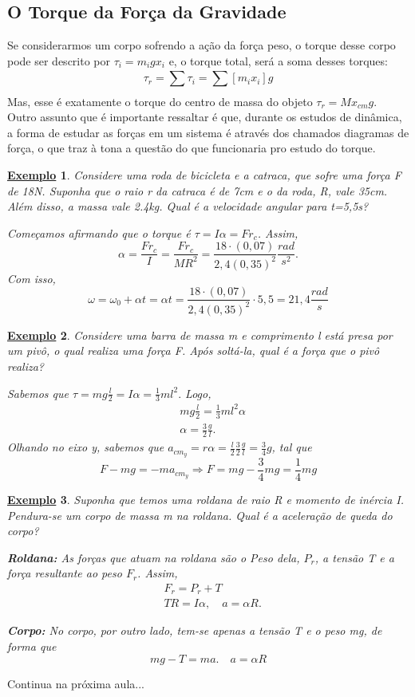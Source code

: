 \documentclass{article}
\newtheorem{example}{\underline{Exemplo}}
\begin{document}
\subsection{O Torque da Força da Gravidade}
  Se considerarmos um corpo sofrendo a ação da força peso, o torque desse corpo pode ser descrito por
  \(\tau_{i} = m_{i}gx_{i}\) e, o torque total, será a soma desses torques: 
    \[
      \tau_{r} = \sum\limits_{}^{}\tau_{i} = \sum\limits_{}^{}[m_{i}x_{i}]g
    \]
  Mas, esse é exatamente o torque do centro de massa do objeto \(\tau_{r} = Mx_{cm}g\). Outro assunto que é
importante ressaltar é que, durante os estudos de dinâmica, a forma de estudar as forças em um sistema é através
dos chamados diagramas de força, o que traz à tona a questão do que funcionaria pro estudo do torque.
\begin{example}
  Considere uma roda de bicicleta e a catraca, que sofre uma força F de 18N. Suponha que o raio r
da catraca é de 7cm e o da roda, R, vale 35cm. Além disso, a massa vale 2.4kg. Qual é a velocidade angular para t=5,5s?

Começamos afirmando que o torque é \(\tau = I\alpha = Fr_{c}\). Assim, 
\[
  \alpha = \frac{Fr_{c}}{I} = \frac{Fr_{c}}{MR^{2}} = \frac{18 \cdot (0,07)}{2,4(0,35)^{2}}\frac{rad}{s^{2}}.
\]
Com isso, 
  \[
    \omega = \omega_{0} + \alpha t = \alpha t = \frac{18 \cdot (0,07)}{2,4(0,35)^{2}} \cdot 5,5 = 21,4 \frac{rad}{s}
  \]
\end{example}
\begin{example}
  Considere uma barra de massa m e comprimento l está presa por um pivô, o qual realiza uma força F. Após soltá-la, qual é a força que o pivô realiza?

  Sabemos que \(\tau = mg \frac{l}{2} = I\alpha = \frac{1}{3}ml^{2}.\) Logo, 
 \begin{align*}
   &mg \frac{l}{2} = \frac{1}{3}ml^{2}\alpha \\
   &\alpha = \frac{3}{2}\frac{g}{l}.
 \end{align*}
 Olhando no eixo y, sabemos que \(a_{cm_{y}} = r\alpha  = \frac{l}{2}\frac{3}{2}\frac{g}{l} = \frac{3}{4}g\), tal que 
   \[
     F - mg = -ma_{cm_y} \Rightarrow F = mg - \frac{3}{4}mg = \frac{1}{4}mg
   \]
\end{example}
\begin{example}
  Suponha que temos uma roldana de raio R e momento de inércia I. Pendura-se um corpo de massa m na roldana. Qual é a aceleração de queda do corpo?

\textbf{Roldana:}
As forças que atuam na roldana são o Peso dela, \(P_{r}\), a tensão T
e a força resultante ao peso \(F_{r}\). Assim, 
\begin{align*}
  &F_{r} = P_{r} + T\\
  &TR = I\alpha,\quad a = \alpha R. 
\end{align*}

\textbf{Corpo:}
No corpo, por outro lado, tem-se apenas a tensão T e o peso mg, de forma que 
  \[
    mg-T = ma.\quad a = \alpha R
  \]
\end{example}
  Continua na próxima aula...
  \newpage
\end{document}
